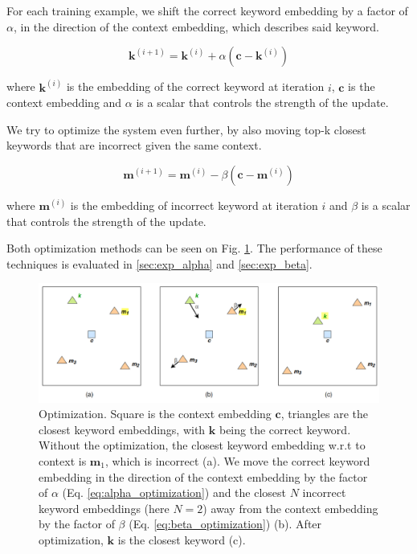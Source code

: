\documentclass{llncs}
\begin{document}
For each training example, we shift the correct keyword embedding by a factor of \(\alpha\), in the direction of the context embedding, which describes said keyword.

\begin{equation}
    \label{eq:alpha_optimization}
    \bm{k}^{(i+1)} = \bm{k}^{(i)} + \alpha(\bm{c} - \bm{k}^{(i)})
\end{equation}

where \(\bm{k}^{(i)}\) is the embedding of the correct keyword at iteration \(i\), \(\bm{c}\) is the context embedding and \(\alpha\) is a scalar that controls the strength of the update.

\smallskip
We try to optimize the system even further, by also moving top-k closest keywords that are incorrect given the same context.

\begin{equation}
    \label{eq:beta_optimization}
    \bm{m}^{(i+1)} = \bm{m}^{(i)} - \beta(\bm{c} - \bm{m}^{(i)})
\end{equation}

where \(\bm{m}^{(i)}\) is the embedding of incorrect keyword at iteration \(i\) and \(\beta\) is a scalar that controls the strength of the update.

Both optimization methods can be seen on Fig. \ref{fig:opt}. The performance of these techniques is evaluated in \ref{sec:exp_alpha} and \ref{sec:exp_beta}.

\begin{figure}
    \centering
    \caption{Optimization. Square is the context embedding \(\bm{c}\), triangles are the closest keyword embeddings, with \(\bm{k}\) being the correct keyword. Without the optimization, the closest keyword embedding w.r.t to context is \(\bm{m}_{1}\), which is incorrect (a). We move the correct keyword embedding in the direction of the context embedding by the factor of \(\alpha\) (Eq. \ref{eq:alpha_optimization}) and the closest \(N\) incorrect keyword embeddings (here \(N=2\)) away from the context embedding by the factor of \(\beta\) (Eq. \ref{eq:beta_optimization}) (b). After optimization, \(\bm{k}\) is the closest keyword (c).}
    \label{fig:opt}
    \includegraphics[scale=0.31]{res/opt.png}
\end{figure}
\end{document}

